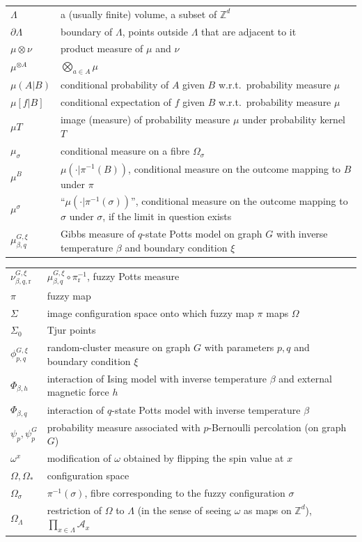 \documentclass[12pt]{article}
\newcommand{\A}{\mathcal{A}}
\renewcommand{\r}{\mathrm{r}}
\newcommand{\Z}{\mathbb{Z}}
\newcommand{\pika}{\boldsymbol{\cdot}}
\newcommand{\1}{\mathbbm{1}}
\newcommand{\5}{\vspace{0.5cm}}
\theoremstyle{definition}
\begin{document}
\begin{tabular}{p{4cm}p{10cm}}
$\Lambda$ & a (usually finite) volume, a subset of $\Z^d$ \\
$\partial\Lambda$ & boundary of $\Lambda$, points outside $\Lambda$ that are adjacent to it \\
$\mu\otimes\nu$ & product measure of $\mu$ and $\nu$ \\
$\mu^{\otimes A}$ & $\bigotimes_{a\in A}\mu$ \\
$\mu(A|B)$ & conditional probability of $A$ given $B$ w.r.t.~probability measure $\mu$ \\
$\mu[f|B]$ & conditional expectation of $f$ given $B$ w.r.t.~probability measure $\mu$ \\
$\mu T$ & image (measure) of probability measure $\mu$ under probability kernel $T$ \\
$\mu_\sigma$ & conditional measure on a fibre $\Omega_\sigma$ \\
$\mu^B$ & $\mu(\pika|\pi^{-1}(B))$, conditional measure on the outcome mapping to $B$ under $\pi$ \\
$\mu^\sigma$ & ``$\mu(\pika|\pi^{-1}(\sigma))$'', conditional measure on the outcome mapping to $\sigma$ under $\sigma$, if the limit in question exists \\
$\mu_{\beta,q}^{G,\xi}$ & Gibbs measure of $q$-state Potts model on graph $G$ with inverse temperature $\beta$ and boundary condition $\xi$ 
\end{tabular}

\pagebreak

\begin{tabular}{p{4cm}p{10cm}}

$\nu_{\beta,q,\r}^{G,\xi}$ & $\mu_{\beta,q}^{G,\xi}\circ\pi_\r^{-1}$, fuzzy Potts measure \\
$\pi$ & fuzzy map \\
$\Sigma$ & image configuration space onto which fuzzy map $\pi$ maps $\Omega$ \\
$\Sigma_0$ & Tjur points \\
$\phi_{p,q}^{G,\xi}$ & random-cluster measure on graph $G$ with parameters $p,q$ and boundary condition $\xi$ \\
$\Phi_{\beta,h}$ & interaction of Ising model with inverse temperature $\beta$ and external magnetic force $h$ \\
$\Phi_{\beta,q}$ & interaction of $q$-state Potts model with inverse temperature $\beta$ \\
$\psi_p,\psi_p^G$ & probability measure associated with $p$-Bernoulli percolation (on graph $G$) \\
$\omega^x$ & modification of $\omega$ obtained by flipping the spin value at $x$ \\ 
$\Omega,\Omega_*$ & configuration space \\
$\Omega_\sigma$ & $\pi^{-1}(\sigma)$, fibre corresponding to the fuzzy configuration $\sigma$ \\
$\Omega_\Lambda$ & restriction of $\Omega$ to $\Lambda$ (in the sense of seeing $\omega$ as maps on $\Z^d$), $\prod_{x\in\Lambda}\A_x$
\end{tabular}
\end{document}
